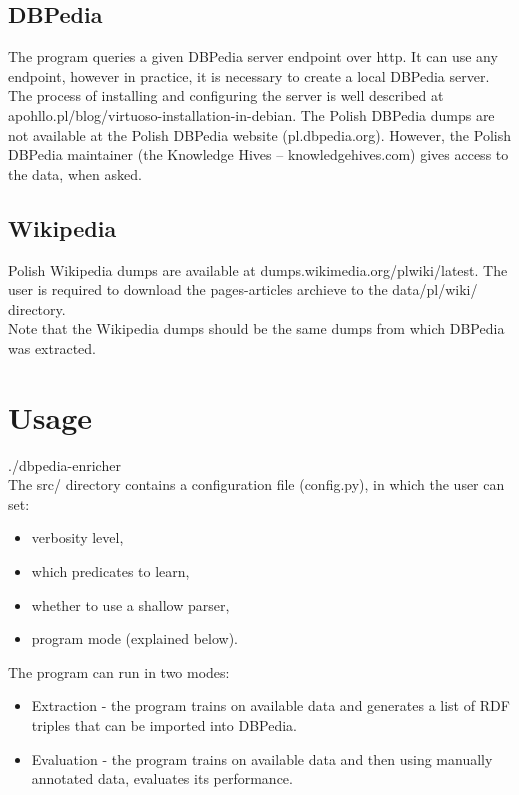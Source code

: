 \documentclass[12pt]{article}
\begin{document}
    \subsection{DBPedia}
    The program queries a given DBPedia server endpoint over http. It can use any endpoint, however in practice, it is necessary to create a local DBPedia server.
    The process of installing and configuring the server is well described at apohllo.pl/blog/virtuoso-installation-in-debian.
    The Polish DBPedia dumps are not available at the Polish DBPedia website (pl.dbpedia.org). However, the Polish DBPedia maintainer (the Knowledge Hives – knowledgehives.com) gives access to the data, when asked.
    \subsection{Wikipedia}
    Polish Wikipedia dumps are available at dumps.wikimedia.org/plwiki/latest.
    The user is required to download the pages-articles archieve to the data/pl/wiki/ directory.\\
    Note that the Wikipedia dumps should be the same dumps from which DBPedia was extracted.
    \section{Usage}
    ./dbpedia-enricher\\
    The src/ directory contains a configuration file (config.py), in which the user can set:
    \begin{itemize}
        \item verbosity level,
        \item which predicates to learn,
        \item whether to use a shallow parser,
        \item program mode (explained below).
    \end{itemize}
    The program can run in two modes:
    \begin{itemize}
        \item Extraction - the program trains on available data and generates a list of RDF triples that can be imported into DBPedia.
        \item Evaluation - the program trains on available data and then using manually annotated data, evaluates its performance.
    \end{itemize}
    
\end{document}
